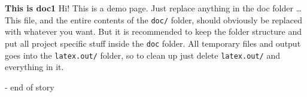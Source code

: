 \documentclass[12pt,a4paper]{report}
\begin{document}
\begin{center}
    \Huge{\textbf{This is doc1}}
    \break{}
    \huge{Hi! This is a demo page. Just replace anything in the doc folder \ldots}
    \break{}
    \normalsize
    This file, and the entire contents of the \texttt{doc/} folder, should obviously be replaced with whatever you want. But it is recommended to keep the folder structure and put all project specific stuff inside the \texttt{doc} folder. All temporary files and output goes into the \texttt{latex.out/} folder, so to clean up just delete \texttt{latex.out/} and everything in it.
    \vfill
    \vspace{20mm}
    
    \vspace{20mm}
    
    \vspace{20mm}
    \break{}
    \huge{- end of story}
    \vfill
\end{center}
\end{document}
